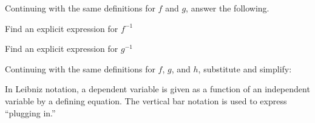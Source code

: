 Continuing with the same definitions for $f$ and $g$, answer the following.

\begin{ProblemSet}[pencil space=3.5in]
 \begin{Problem}
  Find an explicit expression for $f^{-1}$
 \end{Problem}
 \begin{Problem}
  Find an explicit expression for $g^{-1}$
 \end{Problem}
\end{ProblemSet}


\newpage
{}

Continuing with the same definitions for $f$, $g$, and $h$, substitute and simplify:

\begin{multicols}{2}
 \begin{ProblemSet}[pencil space=0in]
 \end{ProblemSet}
\end{multicols}

\newpage


In Leibniz notation, a dependent variable is given as a function of an independent variable by a defining equation.
The vertical bar notation is used to express ``plugging in.''

